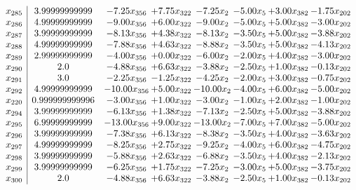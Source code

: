 \documentclass[8pt]{article}
\begin{document}
\[\begin{array}{c| c c@{\hskip 2pt} c@{\hskip 2pt} c@{\hskip 2pt} c@{\hskip 2pt} c@{\hskip 2pt} c@{\hskip 2pt} }
 x_{285}   &  3.99999999999 & -7.25 x_{356} & +  7.75 x_{322} & -7.25 x_{2} & -5.00 x_{5} & +  3.00 x_{382} & -1.75 x_{202}\\
 x_{286}   &  4.99999999999 & -9.00 x_{356} & +  6.00 x_{322} & -9.00 x_{2} & -5.00 x_{5} & +  5.00 x_{382} & -3.00 x_{202}\\
 x_{287}   &  3.99999999999 & -8.13 x_{356} & +  4.38 x_{322} & -8.13 x_{2} & -3.50 x_{5} & +  5.00 x_{382} & -3.88 x_{202}\\
 x_{288}   &  4.99999999999 & -7.88 x_{356} & +  4.63 x_{322} & -8.88 x_{2} & -3.50 x_{5} & +  5.00 x_{382} & -4.13 x_{202}\\
 x_{289}   &  2.99999999999 & -4.00 x_{356} & +  0.00 x_{322} & -6.00 x_{2} & -2.00 x_{5} & +  4.00 x_{382} & -3.00 x_{202}\\
 x_{290}   &  2.0 & -4.88 x_{356} & +  6.63 x_{322} & -3.88 x_{2} & -2.50 x_{5} & +  1.00 x_{382} & -0.13 x_{202}\\
 x_{291}   &  3.0 & -2.25 x_{356} & -1.25 x_{322} & -4.25 x_{2} & -2.00 x_{5} & +  3.00 x_{382} & -0.75 x_{202}\\
 x_{292}   &  4.99999999999 & -10.00 x_{356} & +  5.00 x_{322} & -10.00 x_{2} & -4.00 x_{5} & +  6.00 x_{382} & -5.00 x_{202}\\
 x_{220}   &  0.999999999996 & -3.00 x_{356} & +  1.00 x_{322} & -3.00 x_{2} & -1.00 x_{5} & +  2.00 x_{382} & -1.00 x_{202}\\
 x_{294}   &  3.99999999999 & -6.13 x_{356} & +  1.38 x_{322} & -7.13 x_{2} & -2.50 x_{5} & +  5.00 x_{382} & -3.88 x_{202}\\
 x_{295}   &  6.99999999999 & -13.00 x_{356} & +  9.00 x_{322} & -13.00 x_{2} & -7.00 x_{5} & +  7.00 x_{382} & -5.00 x_{202}\\
 x_{296}   &  3.99999999999 & -7.38 x_{356} & +  6.13 x_{322} & -8.38 x_{2} & -3.50 x_{5} & +  4.00 x_{382} & -3.63 x_{202}\\
 x_{297}   &  4.99999999999 & -8.25 x_{356} & +  2.75 x_{322} & -9.25 x_{2} & -4.00 x_{5} & +  6.00 x_{382} & -4.75 x_{202}\\
 x_{298}   &  3.99999999999 & -5.88 x_{356} & +  2.63 x_{322} & -6.88 x_{2} & -3.50 x_{5} & +  4.00 x_{382} & -2.13 x_{202}\\
 x_{299}   &  3.99999999999 & -6.25 x_{356} & +  1.75 x_{322} & -7.25 x_{2} & -3.00 x_{5} & +  5.00 x_{382} & -3.75 x_{202}\\
 x_{300}   &  2.0 & -4.88 x_{356} & +  6.63 x_{322} & -3.88 x_{2} & -2.50 x_{5} & +  1.00 x_{382} & -0.13 x_{202}\\

\end{array}\]
\end{document}

